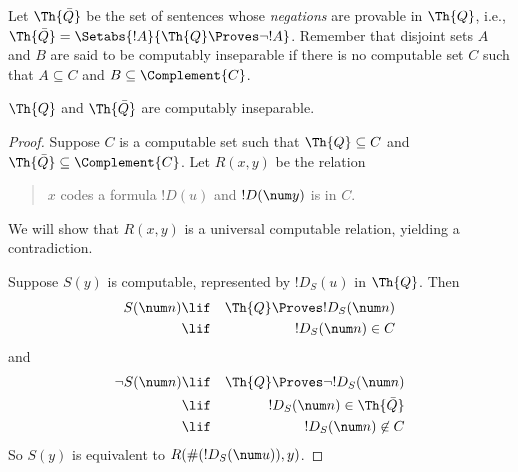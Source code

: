 \documentclass[../../../include/open-logic-section]{subfiles}
\begin{document}



Let $\Th{\bar Q}$ be the set of sentences whose {\em negations} are
provable in $\Th{Q}$, i.e., $\Th{\bar Q} = \Setabs{!A}{\Th{Q} \Proves
  \lnot !A}$. Remember that disjoint sets $A$ and $B$ are said to be
computably inseparable if there is no computable set $C$ such that $A
\subseteq C$ and $B \subseteq \Complement{C}$.

\begin{lem}
$\Th{Q}$ and $\Th{\bar Q}$ are computably inseparable. 
\end{lem}

\begin{proof}
Suppose $C$ is a computable set such that $\Th{Q} \subseteq C$ and
$\Th{\bar Q} \subseteq \Complement{C}$. Let $R(x,y)$ be the relation
\begin{quote}
$x$ codes a formula $!D(u)$ and $!D(\num y)$ is in $C$.
\end{quote}
We will show that $R(x,y)$ is a universal computable relation, yielding
a contradiction.

Suppose $S(y)$ is computable, represented by $!D_S(u)$ in $\Th{Q}$. Then
\begin{eqnarray*}
S(\num n) & \lif & \Th{Q} \Proves !D_S(\num n) \\
& \lif & !D_S(\num n) \in C
\end{eqnarray*}
and 
\begin{eqnarray*}
\lnot S(\num n) & \lif & \Th{Q} \Proves \lnot !D_S(\num n) \\
& \lif & !D_S(\num n) \in \Th{\bar Q} \\
& \lif & !D_S(\num n) \not\in C
\end{eqnarray*}
So $S(y)$ is equivalent to $R(\#(!D_S(\num u)),y)$. 
\end{proof}
\end{document}
